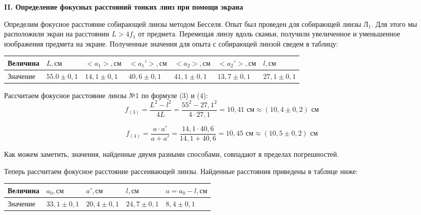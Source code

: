\documentclass[a4paper,12pt]{report}
\begin{document}
\vspace{\baselineskip}
\noindent\textbf{II. Определение фокусных расстояний тонких линз при помощи экрана}

Определим фокусное расстояние собирающей линзы методом Бесселя. Опыт был проведен для собирающей линзы $\text{Л}_{1}$. Для этого мы расположили экран на расстоянии $L >4f_{1}$ от предмета. Перемещая линзу вдоль скамьи, получили увеличенное и уменьшенное изображения предмета на экране. Полученные значения для опыта с собирающей линзой сведем в таблицу:

\begin{table}[h!]
\centering
\begin{tabular}{|l|l|l|l|l|l|l|}
\hline
Величина & $L, \text{см}$             & $<a_{1}>, \text{см}$            & $<a_{1}'>, \text{см}$           & $<a_{2}>, \text{см}$            & $<a_{2}'>, \text{см}$           & $l, \text{см}$             \\ \hline
Значение & $55.0\pm 0,1$ & $14,1\pm0,1 $ & $40,6\pm0,1 $ & $41,1\pm0,1 $ & $13,7\pm0,1 $ & $27,1\pm0,1 $ \\ \hline
\end{tabular}
\end{table}

Рассчитаем фокусное расстояние линзы №1 по формуле (3) и (4):
\begin{equation*}
    f_{(3)} = \frac{L^{2} - l^{2}}{4L} = \frac{55^{2} - 27,1^{2}}{4\cdot 27,1} = 10,41 \text{ см} \approx (10,4 \pm 0,2) \text{ см}
\end{equation*}

\begin{equation*}
    f_{(4)} = \frac{a\cdot a'}{a + a'} = \frac{14,1 \cdot 40,6}{14,1 + 40,6} = 10,45 \text{ см} \approx (10,5 \pm 0,2) \text{ см}
\end{equation*}

Как можем заметить, значения, найденные двумя разными способами, совпадают в пределах погрешностей.

Теперь рассчитаем фокусное расстояние рассеивающей линзы. Найденные расстояния приведены в таблице ниже: 
\begin{table}[h!]
\centering
\begin{tabular}{|l|l|l|l|l|}
\hline
Величина & $a_{0},  \text{см}$           & $a',  \text{см}$           & $l,  \text{см}$            & $a=a_{0}-l,  \text{см}$      \\ \hline
Значение & $33,1\pm0,1$ & $20,4\pm0,1$ & $24,7\pm0,1$ & $8,4\pm0,1$ \\ \hline
\end{tabular}
\end{table}
\end{document}

